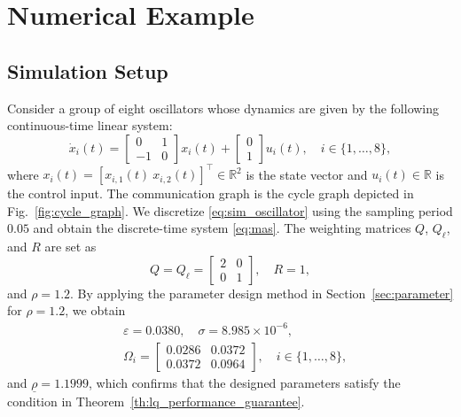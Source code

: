 \documentclass[letterpaper,10pt,conference]{ieeeconf}
\newcommand{\R}{\mathbb{R}}
\begin{document}
\section{Numerical Example}
\label{sec:numerical}

\subsection{Simulation Setup}

Consider a group of eight oscillators whose dynamics are given by the following continuous-time linear system:
\begin{equation} \label{eq:sim_oscillator}
  \dot{x}_i(t) =
  \begin{bmatrix}
    0 & 1 \\
    -1 & 0
  \end{bmatrix} x_i(t)
  +
  \begin{bmatrix}
    0\\
    1
  \end{bmatrix} u_i(t),\quad i \in \{1,\dots,8\},
\end{equation}
where $x_i(t) = [x_{i,1}(t)\ x_{i,2}(t)]^\top \in \R^2$ is the state vector and $u_i(t) \in \R$ is the control input.
The communication graph is the cycle graph depicted in Fig.~\ref{fig:cycle_graph}.
We discretize \eqref{eq:sim_oscillator} using the sampling period $0.05$ and obtain the discrete-time system \eqref{eq:mas}.
The weighting matrices $Q$, $Q_\ell$, and $R$ are set as
\begin{equation}
  Q = Q_\ell = \begin{bmatrix}
    2 & 0 \\
    0 & 1
  \end{bmatrix},\quad
  R = 1,
\end{equation}
and $\rho=1.2$.
By applying the parameter design method in Section~\ref{sec:parameter} for $\rho=1.2$, we obtain
\begin{align}
  &\varepsilon = 0.0380,\quad
  \sigma = 8.985 \times 10^{-6},\\
  &\Omega_i =
  \begin{bmatrix}
    0.0286 & 0.0372\\
    0.0372 & 0.0964
  \end{bmatrix},\quad i\in\{1,\dots,8\},
\end{align}
and $\underline\rho = 1.1999$, which confirms that the designed parameters satisfy the condition in Theorem~\ref{th:lq_performance_guarantee}.
\end{document}
